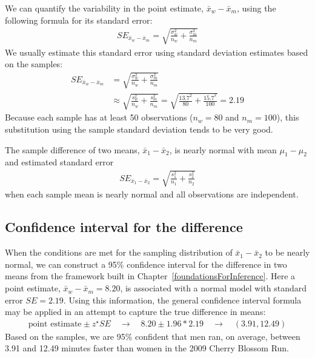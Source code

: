 We can quantify the variability in the point estimate, $\bar{x}_{w} - \bar{x}_{m}$, using the following formula for its standard error:
\begin{eqnarray*}
SE_{\bar{x}_{w} - \bar{x}_{m}} = \sqrt{\frac{\sigma_{w}^2}{n_{w}} + \frac{\sigma_{m}^2}{n_{m}}}
\end{eqnarray*}
We usually estimate this standard error using standard deviation estimates  based on the samples:
\begin{align*}
SE_{\bar{x}_{w} - \bar{x}_{m}}
	&= \sqrt{\frac{\sigma_{w}^2}{n_{w}} + \frac{\sigma_{m}^2}{n_{m}}} \\
	&\approx \sqrt{\frac{s_{w}^2}{n_{w}} + \frac{s_{m}^2}{n_{m}}}
	= \sqrt{\frac{13.7^2}{80} + \frac{15.7^2}{100}} = 2.19
\end{align*}
Because each sample has at least 50 observations ($n_{w} = 80$ and $n_{m} = 100$), this substitution using the sample standard deviation tends to be very good.

\begin{termBox}{
The sample difference of two means, $\bar{x}_1 - \bar{x}_2$, is nearly normal with mean $\mu_{1}-\mu_{2}$ and estimated standard error
\begin{eqnarray}
\textstyle
SE_{\bar{x}_{1} - \bar{x}_{2}} = \sqrt{\frac{s_1^2}{n_1} + \frac{s_2^2}{n_2}}
\label{seOfDifferenceInMeans}
\end{eqnarray}
when each sample mean is nearly normal and all observations are independent.}
\end{termBox}

\subsection{Confidence interval for the difference}

When the conditions are met for the sampling distribution of $\bar{x}_{1} - \bar{x}_{2}$ to be nearly normal, we can construct a 95\% confidence interval for the difference in two means from the framework built in Chapter~\ref{foundationsForInference}. Here a point estimate, $\bar{x}_{w} - \bar{x}_{m} = 8.20$, is associated with a normal model with standard error $SE=2.19$. Using this information, the general confidence interval formula may be applied in an attempt to capture the true difference in means:
\begin{eqnarray*}
\text{point estimate} \pm z^{\star}SE \quad\to\quad 8.20 \pm 1.96*2.19 \quad\to\quad (3.91, 12.49)
\end{eqnarray*}
Based on the samples, we are 95\% confident that men ran, on average, between 3.91 and 12.49 minutes faster than women in the 2009 Cherry Blossom Run.

